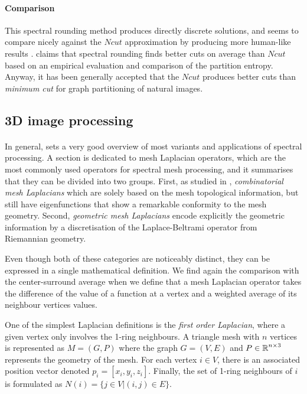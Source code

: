 \paragraph{Comparison}
This spectral rounding method produces directly discrete solutions, and seems to compare nicely against the \(Ncut\) approximation by producing more human-like results \cite{tolliver_spectral_2006}.
\cite{tolliver_graph_2006} claims that spectral rounding finds better cuts on average than \(Ncut\) based on an empirical evaluation and comparison of the partition entropy.
Anyway, it has been generally accepted that the \(Ncut\) produces better cuts than \textit{minimum cut} for graph partitioning of natural images.

\subsection{3D image processing}

\paragraph{}
In general, \cite{zhang_spectral_2010} sets a very good overview of most variants and applications of spectral processing.
A section is dedicated to mesh Laplacian operators, which are the most commonly used operators for spectral mesh processing, and it summarises that they can be divided into two groups.
First, as studied in \cite{chung_spectral_1997}, \textit{combinatorial mesh Laplacians} which are solely based on the mesh topological information, but still have eigenfunctions that show a remarkable conformity to the mesh geometry.
Second, \textit{geometric mesh Laplacians} encode explicitly the geometric information by a discretisation of the Laplace-Beltrami operator from Riemannian geometry.

Even though both of these categories are noticeably distinct, they can be expressed in a single mathematical definition.
We find again the comparison with the center-surround average when we define that a mesh Laplacian operator takes the difference of the value of a function at a vertex and a weighted average of its neighbour vertices values.

One of the simplest Laplacian definitions is the \textit{first order Laplacian}, where a given vertex only involves the 1-ring neighbours.
A triangle mesh with \(n\) vertices is represented as \(M = (G, P)\) where the graph \(G = (V, E)\) and \(P \in \operatorname{\mathbb{R}}^{n\times 3}\) represents the geometry of the mesh.
For each vertex \(i \in V\), there is an associated position vector denoted \(p_i = [x_i, y_i, z_i]\).
Finally, the set of 1-ring neighbours of \(i\) is formulated as \(N(i) = \{j \in V | (i, j) \in E\}\).


